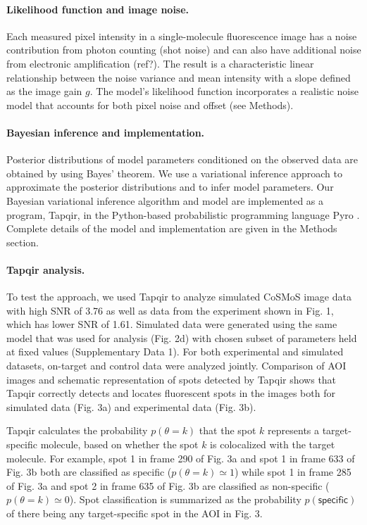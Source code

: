 \paragraph{Likelihood function and image noise.}
Each measured pixel intensity in a single-molecule fluorescence image has a noise contribution from photon counting (shot noise) and can also have additional noise from electronic amplification (ref?). The result is  a characteristic linear relationship between the noise variance and  mean intensity with a slope defined as the image gain $g$. The model's likelihood function incorporates a realistic noise model that accounts for both pixel noise and offset (see Methods). 

\paragraph{Bayesian inference and implementation.}
Posterior distributions of model parameters conditioned on the observed data are obtained by using Bayes' theorem. We use a variational inference approach to approximate the posterior distributions and to infer model parameters. Our Bayesian variational inference algorithm and model are implemented as a program, Tapqir, in the Python-based probabilistic programming language Pyro \cite{Bingham2019-qy}. Complete details of the model and implementation are given in the Methods section.

\paragraph{Tapqir analysis.} %
To test the approach, we used Tapqir to analyze simulated CoSMoS image data with high SNR of 3.76 as well as data from the experiment shown in Fig. 1, which has lower SNR of 1.61. Simulated data were generated using the same model that was used for analysis (Fig. 2d) with chosen subset of parameters held at fixed values (Supplementary Data 1). For both experimental and simulated datasets, on-target and control data were analyzed jointly. Comparison of AOI images and schematic representation of spots detected by Tapqir shows that Tapqir correctly detects and locates fluorescent spots in the images both for simulated data (Fig. 3a) and experimental data (Fig. 3b).

Tapqir calculates the probability $p(\theta=k)$ that the spot $k$ represents a target-specific molecule, based on whether the spot $k$ is colocalized with the target molecule.  For example, spot 1 in frame 290 of Fig. 3a and spot 1 in frame 633 of Fig. 3b both are classified as specific ($p(\theta=k) \simeq 1$) while spot 1 in frame 285 of Fig. 3a and spot 2 in frame 635 of Fig. 3b are classified as non-specific ($p(\theta=k) \simeq 0$). Spot classification is summarized as the probability  $p(\mathsf{specific})$ of there being any target-specific spot in the AOI in Fig. 3. 

